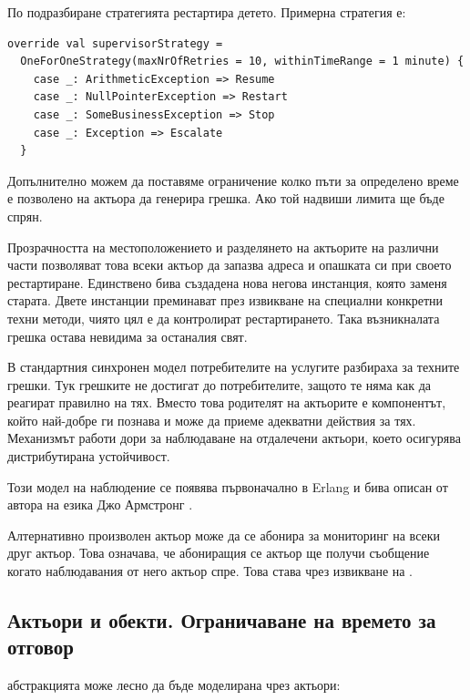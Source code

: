 По подразбиране стратегията рестартира детето. Примерна стратегия е:

\begin{lstlisting}
override val supervisorStrategy =
  OneForOneStrategy(maxNrOfRetries = 10, withinTimeRange = 1 minute) {
    case _: ArithmeticException => Resume
    case _: NullPointerException => Restart
    case _: SomeBusinessException => Stop
    case _: Exception => Escalate
  }
\end{lstlisting}

Допълнително можем да поставяме ограничение колко пъти за определено време е позволено на актьора да генерира грешка. Ако той надвиши лимита ще бъде спрян.

Прозрачността на местоположението и разделянето на актьорите на различни части позволяват това всеки актьор да запазва адреса и опашката си при своето рестартиране. Единствено бива създадена нова негова инстанция, която заменя старата. Двете инстанции преминават през извикване на специални конкретни техни методи, чиято цял е да контролират рестартирането. Така възникналата грешка остава невидима за останалия свят.

В стандартния синхронен модел потребителите на услугите разбираха за техните грешки. Тук грешките не достигат до потребителите, защото те няма как да реагират правилно на тях. Вместо това родителят на актьорите е компонентът, който най-добре ги познава и може да приеме адекватни действия за тях. Механизмът работи дори за наблюдаване на отдалечени актьори, което осигурява дистрибутирана устойчивост.

Този модел на наблюдение се появява първоначално в Erlang и бива описан от автора на езика Джо Армстронг \cite{armstrong2003ReliableDistributedSystems}.

Алтернативно произволен актьор може да се абонира за мониторинг на всеки друг актьор. Това означава, че абониращия се актьор ще получи съобщение когато наблюдавания от него актьор спре. Това става чрез извикване на .

\subsection{Актьори и  обекти. Ограничаване на времето за отговор}

 абстракцията може лесно да бъде моделирана чрез актьори:

